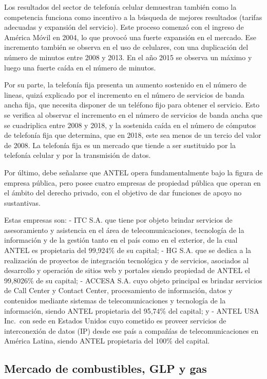\documentclass[
  12pt,
  spanish,
]{book}
\begin{document}
Los resultados del sector de telefonía celular demuestran también como la competencia funciona como incentivo a la búsqueda de mejores resultados (tarifas adecuadas y expansión del servicio). Este proceso comenzó con el ingreso de América Móvil en 2004, lo que provocó una fuerte expansión en el mercado. Ese incremento también se observa en el uso de celulares, con una duplicación del número de minutos entre 2008 y 2013. En el año 2015 se observa un máximo y luego una fuerte caída en el número de minutos.

Por su parte, la telefonía fija presenta un aumento sostenido en el número de lineas, quizá explicado por el incremento en el número de servicios de banda ancha fija, que necesita disponer de un teléfono fijo para obtener el servicio. Esto se verifica al observar el incremento en el número de servicios de banda ancha que se cuadriplica entre 2008 y 2018, y la sostenida caída en el número de cómputos de telefonía fija que determina, que en 2018, este sea menos de un tercio del valor de 2008. La telefonía fija es un mercado que tiende a ser sustituido por la telefonía celular y por la transmisión de datos.

Por último, debe señalarse que ANTEL opera fundamentalmente bajo la figura de empresa pública, pero posee cuatro empresas de propiedad pública que operan en el ámbito del derecho privado, con el objetivo de dar funciones de apoyo no sustantivas.

Estas empresas son:
- ITC S.A. que tiene por objeto brindar servicios de asesoramiento y asistencia en el área de telecomunicaciones, tecnología de la información y de la gestión tanto en el país como en el exterior, de la cual ANTEL es propietaria del 99,924\% de su capital;
- HG S.A. que se dedica a la realización de proyectos de integración tecnológica y de servicios, asociados al desarrollo y operación de sitios web y portales siendo propiedad de ANTEL el 99,8026\% de su capital;
- ACCESA S.A. cuyo objeto principal es brindar servicios de Call Center y Contact Center, procesamiento de información, datos y contenidos mediante sistemas de telecomunicaciones y tecnología de la información, siendo ANTEL propietaria del 95,74\% del capital; y
- ANTEL USA Inc.~con sede en Estados Unidos cuyo cometido es proveer servicios de interconexión de datos (IP) desde ese país a compañías de telecomunicaciones en América Latina, siendo ANTEL propietaria del 100\% del capital.

\hypertarget{mercado-de-combustibles-glp-y-gas}{%
\subsection{Mercado de combustibles, GLP y gas}\label{mercado-de-combustibles-glp-y-gas}}
\end{document}

